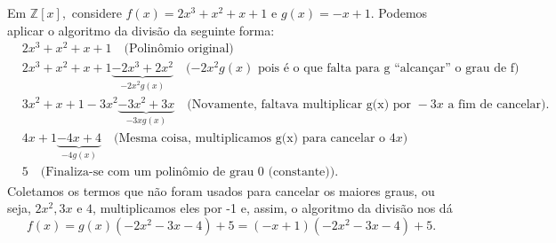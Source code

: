 \documentclass[algebraII_notes.tex]{subfiles}
\begin{document}
\begin{example}
	Em \(\mathbb{Z}[x],\) considere \(f(x) = 2x^{3} + x^{2} + x + 1\)  e \(g(x) = -x + 1.\)
	Podemos aplicar o algoritmo da divisão da seguinte forma:
	\begin{align*}
		 & 2x^{3} + x^{2} + x + 1\quad \text{(Polinômio original)}                                                                                             \\
		 & 2x^{3} + x^{2} + x + 1 \underbrace{- 2x^{3} + 2x^{2}}_{-2x^{2}g(x)} \quad (-2x^{2}g(x)\text{ pois é o que falta para g ``alcançar'' o grau de f)}   \\
		 & 3x^{2} + x + 1 - 3x^{2} \underbrace{- 3x^{2} + 3x}_{-3xg(x)} \quad (\text{Novamente, faltava multiplicar g(x) por } -3x \text{ a fim de cancelar).} \\
		 & 4x + 1 \underbrace{- 4x + 4}_{-4g(x)} \quad\text{(Mesma coisa, multiplicamos g(x) para cancelar o } 4x)                                             \\
		 & 5\quad\text{(Finaliza-se com um polinômio de grau 0 (constante)).}
	\end{align*}
	Coletamos os termos que não foram usados para cancelar os maiores graus, ou seja, \(2x^{2}, 3x\) e \(4\), multiplicamos eles por -1 e, assim, o algoritmo da divisão nos dá
	\[
		f(x) = g(x)(-2x^{2} -3x -4) + 5 = (-x+1)(-2x^{2}-3x-4)+5.
	\]
\end{example}
\end{document}

